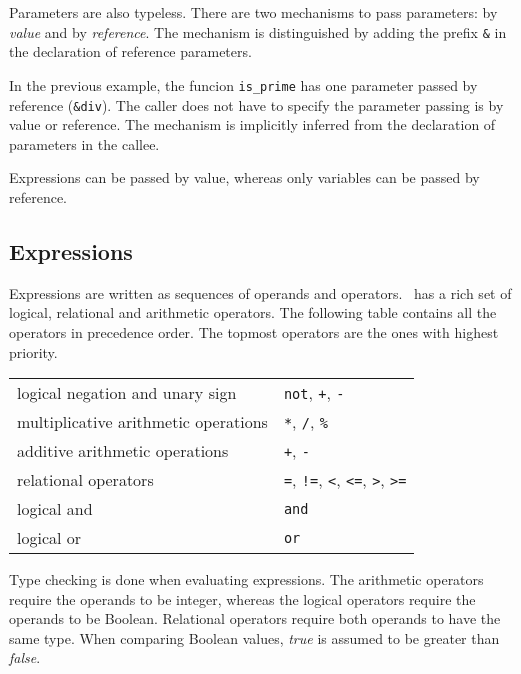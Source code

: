 Parameters are also typeless. There are two mechanisms to pass parameters:
by \emph{value} and by \emph{reference}. The mechanism is distinguished
by adding the prefix \texttt{\&} in the declaration of reference
parameters.

In the previous example, the funcion \texttt{is\_prime} has one
parameter passed by reference (\texttt{\&div}). The caller does not have
to specify the parameter passing is by value or reference. The
mechanism is implicitly inferred from the declaration of parameters
in the callee.

Expressions can be passed by value, whereas only variables can be
passed by reference.

\subsection{Expressions}

Expressions are written as sequences of operands and operators.
\asl\ has a rich set of logical, relational and arithmetic operators.
The following table contains all the operators in precedence order.
The topmost operators are the ones with highest priority.

\begin{center}
\begin{tabular}{ll}
logical negation and unary sign & \texttt{not}, \texttt{+}, \texttt{-} \\
multiplicative arithmetic operations & \texttt{*}, \texttt{/}, \texttt{\%}\\
additive arithmetic operations & \texttt{+}, \texttt{-}\\
relational operators & \texttt{=}, \texttt{!=}, \texttt{<}, \texttt{<=}, \texttt{>}, \texttt{>=}\\
logical and & \texttt{and}\\
logical or & \texttt{or}
\end{tabular}
\end{center}

Type checking is done when evaluating expressions. The arithmetic
operators require the operands to be integer, whereas the logical
operators require the operands to be Boolean. Relational operators
require both operands to have the same type. When comparing Boolean
values, \emph{true} is assumed to be greater than \emph{false}.

